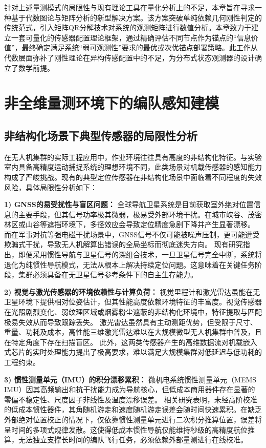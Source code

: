 针对上述量测模式的局限性与现有理论工具在量化分析上的不足，本章旨在寻求一种基于代数图论与矩阵分析的新型解决方案。该方案突破单纯依赖几何刚性判定的传统范式，引入矩阵QR分解技术对系统的观测矩阵进行数值分析。本章致力于建立一套可量化的传感器配置理论框架，通过精确评估不同节点作为锚点的“信息价值”，最终确定满足系统“弱可观测性”要求的最优或次优锚点部署策略。此工作从代数层面弥补了刚性理论在异构传感配置中的不足，为分布式状态观测器的设计确立了数学前提。

\section{非全维量测环境下的编队感知建模}

\subsection{非结构化场景下典型传感器的局限性分析}

在无人机集群的实际工程应用中，作业环境往往具有高度的非结构化特征。与实验室内具备高精度运动捕捉系统的理想环境不同，此类场景对机载传感器的感知能力构成了严峻挑战。现有的典型定位传感器在非结构化场景中面临着不同程度的失效风险，具体局限性分析如下：

\textbf{1) GNSS的易受扰性与盲区问题\cite{2022A, XDDH202506001}：}
全球导航卫星系统是目前获取室外绝对位置信息的主要手段，但其信号功率极其微弱，极易受外部环境干扰。在城市峡谷、茂密林区或山谷等遮挡环境下，多径效应会导致定位精度急剧下降并产生显著漂移。
而在军事对抗等强电磁干扰场景中，GNSS信号不仅可能被噪声压制，更可能遭受欺骗式干扰，导致无人机解算出错误的全局坐标而彻底迷失方向。
现有研究指出，即便采用惯性导航与卫星信号的深组合技术，一旦卫星信号完全中断，系统将退化为纯惯性导航模式，无法从根本上解决持续定位问题。这意味着在关键任务阶段，集群必须具备在无卫星信号参考条件下的自主生存能力。

\textbf{2) 视觉与激光传感器的环境依赖性与计算负荷\cite{Lu2018ASO,8517639}：}
视觉里程计和激光雷达虽能在无卫星环境下提供相对位姿估计，但其性能高度依赖环境特征的丰富度。视觉传感器在光照剧烈变化、弱纹理区域或烟雾粉尘遮蔽的非结构化环境中，特征提取与匹配极易失效从而导致跟踪丢失。
激光雷达虽然具有主动测距优势，但受限于尺寸、重量、功耗及成本，高性能三维激光雷达难以在大规模微型无人机集群中普及，且在特定角度下存在扫描盲区。
此外，这两类传感器产生的高维数据流对机载嵌入式芯片的实时处理能力提出了极高要求，难以满足大规模集群对低延迟与低功耗的工程约束。

\textbf{3) 惯性测量单元（IMU）的积分漂移累积\cite{Sahawneh2008DevelopmentAC}：}
微机电系统惯性测量单元（MEMS IMU）因其高频输出和抗干扰能力成为导航核心，但低成本商用器件存在显著的零偏不稳定性、尺度因子非线性及温度漂移误差。
相关研究表明，未经高阶校准的低成本惯性器件，其角随机游走和速度随机游走误差会随时间快速累积。在缺乏外部绝对位置校正的情况下，仅依靠惯性测量单元进行二次积分推算位置，误差将呈时间的多项式规律发散。这使得低成本惯性导航仅能维持秒级的高精度航位推算，无法独立支撑长时间的编队飞行任务，必须依赖外部量测进行在线校准。

